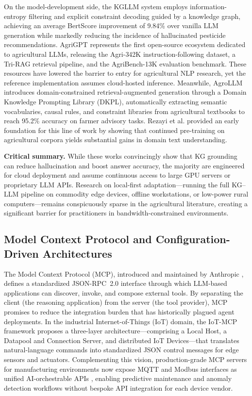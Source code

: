 \documentclass[11pt,a4paper]{article}
\begin{document}
On the model-development side, the KGLLM system \cite{kgllm2024} employs information-entropy filtering and explicit constraint decoding guided by a knowledge graph, achieving an average BertScore improvement of 9.84\% over vanilla LLM generation while markedly reducing the incidence of hallucinated pesticide recommendations. AgriGPT \cite{yang2025agrigpt} represents the first open-source ecosystem dedicated to agricultural LLMs, releasing the Agri-342K instruction-following dataset, a Tri-RAG retrieval pipeline, and the AgriBench-13K evaluation benchmark. These resources have lowered the barrier to entry for agricultural NLP research, yet the reference implementation assumes cloud-hosted inference. Meanwhile, AgroLLM \cite{samuel2025agrollm} introduces domain-constrained retrieval-augmented generation through a Domain Knowledge Prompting Library (DKPL), automatically extracting semantic vocabularies, causal rules, and constraint libraries from agricultural textbooks to reach 95.2\% accuracy on farmer advisory tasks. Rezayi et al. \cite{rezayi2022agribert} provided an early foundation for this line of work by showing that continued pre-training on agricultural corpora yields substantial gains in domain text understanding.

\textbf{Critical summary.} While these works convincingly show that KG grounding can reduce hallucination and boost answer accuracy, the majority are engineered for cloud deployment and assume continuous access to large GPU servers or proprietary LLM APIs. Research on local-first adaptation---running the full KG--LLM pipeline on commodity edge devices, offline workstations, or low-power rural computers---remains conspicuously sparse in the agricultural literature, creating a significant barrier for practitioners in bandwidth-constrained environments.

\subsection{Model Context Protocol and Configuration-Driven Architectures}

The Model Context Protocol (MCP), introduced and maintained by Anthropic \cite{anthropic2024mcp}, defines a standardized JSON-RPC~2.0 interface through which LLM-based applications can discover, invoke, and compose external tools. By separating the client (the reasoning application) from the server (the tool provider), MCP promises to reduce the integration burden that has historically plagued agent deployments. In the industrial Internet-of-Things (IoT) domain, the IoT-MCP framework \cite{iotmcp2025} proposes a three-layer architecture---comprising a Local Host, a Datapool and Connection Server, and distributed IoT Devices---that translates natural-language commands into standardized JSON control messages for edge sensors and actuators. Complementing this vision, production-grade MCP servers for manufacturing environments now expose MQTT and Modbus interfaces as unified AI-orchestrable APIs \cite{iotedgemcp2025}, enabling predictive maintenance and anomaly detection workflows without bespoke API integration for each device vendor.
\end{document}

